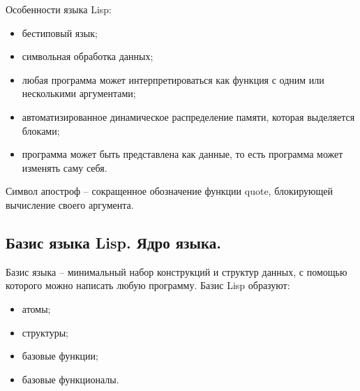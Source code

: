 Особенности языка Lisp:
\begin{itemize}[label*=---]
	\item бестиповый язык;
	\item символьная обработка данных;
	\item любая программа может интерпретироваться как функция с одним или несколькими аргументами;
	\item автоматизированное динамическое распределение памяти, которая выделяется блоками;
	\item программа может быть представлена как данные, то есть программа может изменять саму себя.
	
\end{itemize}

Символ апостроф -- сокращенное обозначение функции quote, блокирующей вычисление своего аргумента.

\subsection{Базис языка Lisp. Ядро языка.}

Базис языка -- минимальный набор конструкций и структур данных, с помощью которого можно написать любую программу.
Базис Lisp образуют:
\begin{itemize}[label*=---]
	\item атомы;
	\item структуры;
	\item базовые функции;
	\item базовые функционалы.
\end{itemize}

